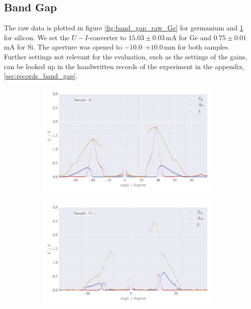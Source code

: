 \subsection{Band Gap}
The raw data is plotted in figure \ref{fig:band_gap_raw_Ge} for 
germanium and \ref{fig:band_gap_raw_Si} for silicon. 
We set the $U-I$-converter to $15.03 \pm 0.03\,$mA for Ge 
and $0.75 \pm 0.01\,$mA for Si. The aperture was opened to 
$-10.0$--$+10.0\,$mm for both samples. Further settings 
not relevant for the evaluation, such as the settings of the gains, 
can be looked up in the 
handwritten records of the experiment in the appendix, 
\ref{sec:records_band_gap}. 
\begin{figure}
    \centering
    \begin{subfigure}[b]{\pltw}
        \includegraphics[width=1.0\linewidth]{figures/band_gap_raw_Si}
        \caption{}
        \label{fig:band_gap_raw_Si}
    \end{subfigure}
    \begin{subfigure}[b]{\pltw}
        \includegraphics[width=1.0\linewidth]{figures/band_gap_raw_Ge}

\end{subfigure}
\end{figure}
